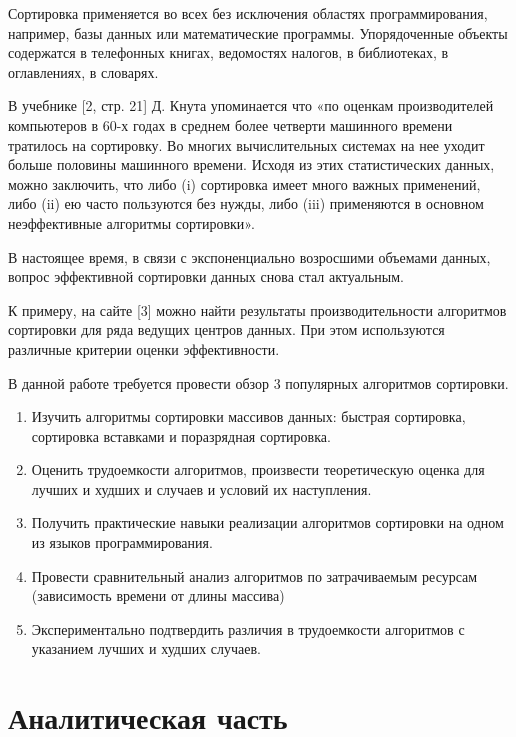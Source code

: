 \documentclass[a4paper,14pt]{article} %
\begin{document}
	\hfill
	
	Сортировка применяется во всех без исключения областях программирования, например, базы данных или математические программы. Упорядоченные объекты содержатся в телефонных книгах, ведомостях налогов, в библиотеках, в оглавлениях, в словарях. 
	
	\hfill
	
	В учебнике [2, стр. 21] Д. Кнута упоминается что «по оценкам производителей компьютеров в 60-х годах в среднем более четверти машинного времени тратилось на сортировку. Во многих вычислительных системах на нее уходит больше половины машинного времени. Исходя из этих статистических данных, можно заключить, что либо (i) сортировка имеет много важных применений, либо (ii) ею часто пользуются без нужды, либо (iii) применяются в основном неэффективные алгоритмы сортировки». 
	
	\hfill
	
	В настоящее время, в связи с экспоненциально возросшими объемами данных, вопрос эффективной сортировки данных снова стал актуальным.
	
	\hfill
	
	К примеру, на сайте [3] можно найти результаты производительности алгоритмов сортировки для ряда ведущих центров данных. При этом используются различные критерии оценки эффективности. 
	
	\hfill
	
	В данной работе требуется провести обзор 3 популярных алгоритмов сортировки. 
	\begin{enumerate}
		\item Изучить алгоритмы сортировки массивов данных: быстрая сортировка, сортировка вставками и поразрядная сортировка. 
		\item Оценить трудоемкости алгоритмов, произвести теоретическую оценка для лучших и худших и случаев и условий их наступления. 
		\item Получить практические навыки реализации алгоритмов сортировки на одном из языков программирования. 
		\item Провести сравнительный анализ алгоритмов по затрачиваемым ресурсам (зависимость времени от длины массива)
		\item Экспериментально подтвердить различия в трудоемкости алгоритмов с указанием лучших и худших случаев. 
	\end{enumerate}
	
	\newpage


        \section{Аналитическая часть}
        \hfill
       
\end{document}
